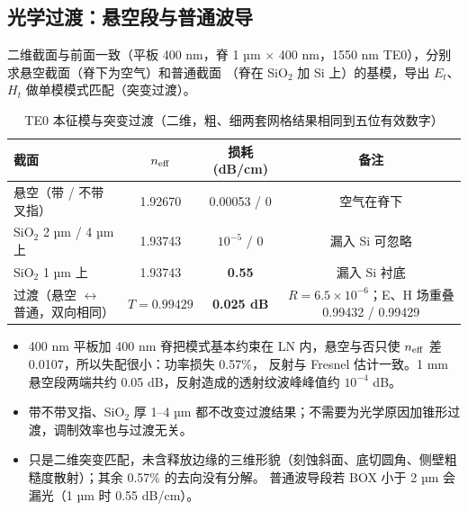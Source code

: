\documentclass[10pt,a4paper]{article}
\begin{document}
\subsection{光学过渡：悬空段与普通波导}
二维截面与前面一致（平板 400 nm，脊 1 µm $\times$ 400 nm，1550 nm TE0），分别求悬空截面（脊下为空气）和普通截面
（脊在 SiO$_2$ 加 Si 上）的基模，导出 $E_t$、$H_t$ 做单模模式匹配（突变过渡）。

\begin{table}[H]
\centering\footnotesize
\caption{TE0 本征模与突变过渡（二维，粗、细两套网格结果相同到五位有效数字）}
\begin{tabular}{L{4.6cm}ccc}
\toprule
截面 & $n_{\rm eff}$ & 损耗 (dB/cm) & 备注 \\
\midrule
悬空（带 / 不带叉指） & 1.92670 & 0.00053 / 0 & 空气在脊下 \\
SiO$_2$ 2 µm / 4 µm 上 & 1.93743 & $10^{-5}$ / 0 & 漏入 Si 可忽略 \\
SiO$_2$ 1 µm 上 & 1.93743 & \textbf{0.55} & 漏入 Si 衬底 \\
\midrule
过渡（悬空 $\leftrightarrow$ 普通，双向相同） & $T = 0.99429$ & \textbf{0.025 dB} & $R = 6.5\times10^{-6}$；E、H 场重叠 0.99432 / 0.99429 \\
\bottomrule
\end{tabular}
\end{table}

\begin{itemize}
  \item 400 nm 平板加 400 nm 脊把模式基本约束在 LN 内，悬空与否只使 $n_{\rm eff}$ 差 0.0107，所以失配很小：功率损失 0.57\%，
        反射与 Fresnel 估计一致。1 mm 悬空段两端共约 0.05 dB，反射造成的透射纹波峰峰值约 $10^{-4}$ dB。
  \item 带不带叉指、SiO$_2$ 厚 1--4 µm 都不改变过渡结果；不需要为光学原因加锥形过渡，调制效率也与过渡无关。
  \item 只是二维突变匹配，未含释放边缘的三维形貌（刻蚀斜面、底切圆角、侧壁粗糙度散射）；其余 0.57\% 的去向没有分解。
        普通波导段若 BOX 小于 2 µm 会漏光（1 µm 时 0.55 dB/cm）。
\end{itemize}
\end{document}
